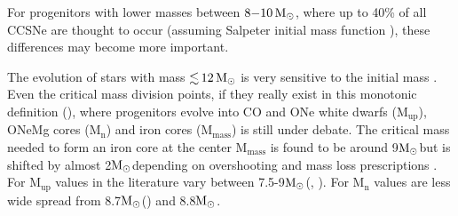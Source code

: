 \documentclass[fleqn,usenatbib]{mnras}
\newcommand{\solm}{\xspace\ensuremath{\rm{M_{\odot}}}}
\begin{document}
For progenitors with lower masses between $8\mathord{-}10\, \solm$, where up to 40\% of all CCSNe are thought to occur (assuming Salpeter initial mass function  \citep{Salpeter1955}), these differences may become more important. 

The evolution of stars with mass $\mathord{\lesssim}\,12\, \solm$ is very sensitive to the initial mass \citep{Woosley2015}.
Even the critical mass division points, if they really exist in this monotonic definition (\cite{Woosley2015}), where progenitors evolve into CO and ONe white dwarfs ($\mathrm{M_{up}}$), ONeMg cores ($\mathrm{M_{n}}$) and iron cores ($\mathrm{M_{mass}}$) is still under debate. 
The critical mass needed to form an iron core at the center $\mathrm{M_{mass}}$ is found to be around 9\solm but is shifted by almost 2\solm depending on overshooting and mass loss prescriptions \cite{Siess2007}. 
For $\mathrm{M_{up}}$ values in the literature vary between 7.5-9\solm (\cite{Poelarends2008},  \cite{Siess2007EvolutionAGBstars}). For $\mathrm{M_{n}}$ values are less wide spread from 8.7\solm (\cite{Jones2013}) and 8.8\solm \cite{Nomoto1984EvolutionCores}.
\end{document}
